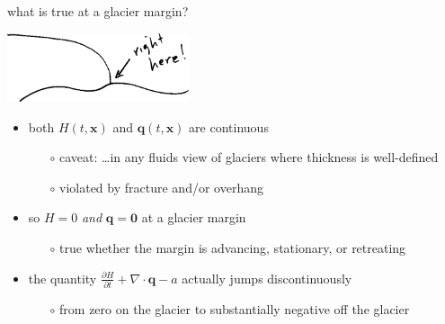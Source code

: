 \documentclass[10pt,hyperref,dvipsnames]{beamer}
\newcommand{\bq}{\mathbf{q}}
\newcommand{\bx}{\mathbf{x}}
\newcommand{\bzero}{\bm{0}}
\newcommand{\Div}{\nabla\cdot}
\begin{document}
\begin{frame}{what is true at a glacier margin?}

\begin{center}
\includegraphics[width=0.4\textwidth]{figs/margin.png}
\end{center}

\bigskip
\begin{itemize}
\item both $H(t,\bx)$ and $\bq(t,\bx)$ are continuous
    \begin{itemize}
    \item[$\circ$] caveat: \dots in any fluids view of glaciers where thickness is well-defined
    \item[$\circ$] violated by fracture and/or overhang
    \end{itemize}

\medskip
\item so \alert{$H=0$ \emph{and} $\bq=\bzero$ at a glacier margin}
    \begin{itemize}
    \item[$\circ$] true whether the margin is advancing, stationary, or retreating
    \end{itemize}

\medskip
\item the quantity \quad $\frac{\partial H}{\partial t} + \Div \bq - a$ \quad actually jumps discontinuously
    \begin{itemize}
    \item[$\circ$] from zero on the glacier to substantially negative off the glacier
    \end{itemize}
\end{itemize}
\end{frame}
\end{document}
